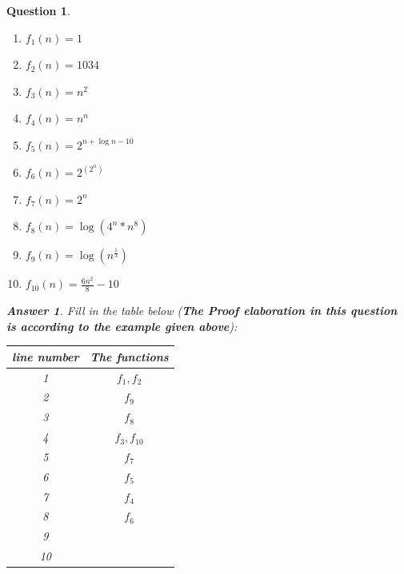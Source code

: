 \documentclass[a4paper]{article}
\theoremstyle{remarksStyle}
\theoremstyle{questionStyle}
\newtheorem{question}{Question}
\theoremstyle{answerStyle}
\newtheorem{answer}{Answer}
\begin{document}
\begin{question}
\begin{enumerate}
    \item $f_{1}(n) = 1$
    \item $f_{2}(n) = 1034$
    \item $f_{3}(n) = n^{2}$
    \item $f_{4}(n) = n^{n}$
    \item $f_{5}(n) = 2^{n + \log n - 10}$
    \item $f_{6}(n) = 2^{(2^{n})}$
    \item $f_{7}(n) = 2^{n}$
    \item $f_{8}(n) = \log{(4^{n}*n^{8})}$
    \item $f_{9}(n) = \log{(n^{\frac{1}{3}})}$
    \item $f_{10}(n) = \frac{6n^2}{8} - 10$
   
\end{enumerate}


\begin{answer}
    Fill in the table below (\textbf{The Proof elaboration in this question is according to the example given above}):
\end{answer}

\begin{center}
\begin{tabular}{||c | c ||} 
 \hline
 line number & The functions \\ [0.5ex] 
 \hline\hline
 1 & $f_{1},f_{2}$ \\
 \hline
 2 & $f_{9}$ \\ 
 \hline
 3 & $f_{8}$\\
 \hline
 4 & $f_{3},f_{10}$ \\
 \hline
 5 & $f_{7}$ \\
 \hline
 6 & $f_{5}$ \\
 \hline
 7 & $f_{4}$ \\
 \hline
 8 & $f_{6}$ \\
 \hline
 9 &  \\
 \hline
 10 & \\
 \hline
\end{tabular}
\end{center}
\end{question}
\end{document}

